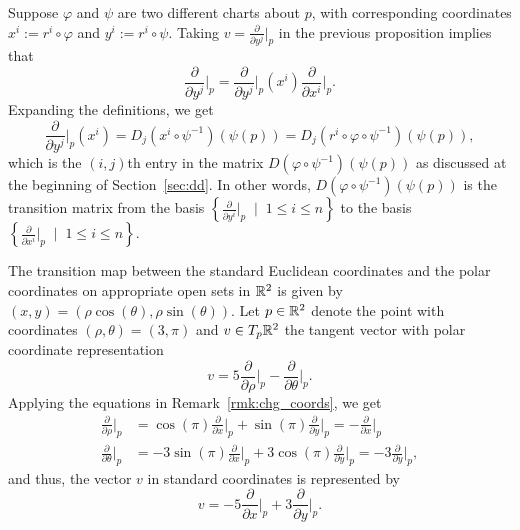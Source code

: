 \begin{remark}\label{rmk:chg_coords}
	Suppose $\varphi$ and $\psi$ are two different charts about $p$, with corresponding coordinates $x^i := r^i \circ \varphi$ and $y^i := r^i \circ \psi$.
	Taking $v = \frac{\partial}{\partial y^j}\Big|_p$ in the previous proposition implies that
	\begin{equation}
		\frac{\partial}{\partial y^j}\Big|_p =
		\frac{\partial}{\partial y^j}\Big|_p (x^i) \frac{\partial}{\partial x^i}\Big|_p.
	\end{equation}
	Expanding the definitions, we get
	\begin{equation}
		\frac{\partial}{\partial y^j}\Big|_p (x^i) =
		D_j(x^i\circ\psi^{-1})(\psi(p)) =
		D_j(r^i \circ \varphi \circ \psi^{-1})(\psi(p)),
	\end{equation}
	which is the $(i,j)$th entry in the matrix $D(\varphi\circ\psi^{-1})(\psi(p))$ as discussed at the beginning of Section~\ref{sec:dd}.
	In other words, $D(\varphi\circ\psi^{-1})(\psi(p))$ is the transition matrix from the basis $\left\{\frac{\partial}{\partial y^i}\Big|_p\;\mid\; 1\leq i\leq n\right\}$ to the basis $\left\{\frac{\partial}{\partial x^i}\Big|_p\;\mid\; 1\leq i\leq n\right\}$.
\end{remark}

\begin{example}
	The transition map between the standard Euclidean coordinates and the polar coordinates on appropriate open sets in $\mathbb{R}^2$ is given by $(x,y) = (\rho\cos(\theta), \rho\sin(\theta))$. Let $p\in\mathbb{R}^2$ denote the point with coordinates $(\rho, \theta) = (3, \pi)$ and $v\in T_p\mathbb{R}^2$ the tangent vector with polar coordinate representation
	\begin{equation}
		v = 5\frac{\partial}{\partial \rho}\Big|_p - \frac{\partial}{\partial \theta}\Big|_p.
	\end{equation}
	Applying the equations in Remark~\ref{rmk:chg_coords}, we get
	\begin{align}
		\frac{\partial}{\partial \rho}\Big|_p
		 & = \cos(\pi)\frac{\partial}{\partial x}\Big|_p + \sin(\pi)\frac{\partial}{\partial y}\Big|_p = - \frac{\partial}{\partial x}\Big|_p      \\
		\frac{\partial}{\partial \theta}\Big|_p
		 & = -3\sin(\pi)\frac{\partial}{\partial x}\Big|_p + 3\cos(\pi)\frac{\partial}{\partial y}\Big|_p = -3 \frac{\partial}{\partial y}\Big|_p,
	\end{align}
	and thus, the vector $v$ in standard coordinates is represented by
	\begin{equation}
		v = - 5 \frac{\partial}{\partial x}\Big|_p + 3 \frac{\partial}{\partial y}\Big|_p.
	\end{equation}
\end{example}

